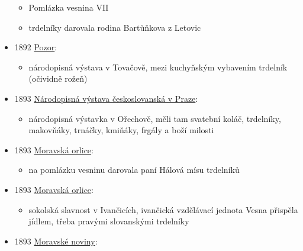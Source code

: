 \begin{itemize}
  \begin{itemize}
  \tightlist
  \item
    Pomlázka vesnina VII
  \item
    trdelníky darovala rodina Bartůňkova z Letovic
  \end{itemize}
\item
  1892
  \href{https://www.digitalniknihovna.cz/vkol/uuid/uuid:db92b18a-5f60-46e9-a666-022fa9c0f4f6}{Pozor}:

  \begin{itemize}
  \tightlist
  \item
    národopisná výstava v Tovačově, mezi kuchyňským vybavením trdelník
    (očividně rožeň)
  \end{itemize}
\item
  1893
  \href{https://ceskadigitalniknihovna.cz/uuid/uuid:765160d0-b6d7-11ea-b68c-005056827e52}{Národopisná
  výstava českoslovanská v Praze}:

  \begin{itemize}
  \tightlist
  \item
    národopisná výstavka v Ořechově, měli tam svatební koláč, trdelníky,
    makovňáky, trnáčky, kmiňáky, frgály a boží milosti
  \end{itemize}
\item
  1893
  \href{https://ceskadigitalniknihovna.cz/view/uuid:04fd1c48-32f0-11de-992b-00145e5790ea?page=uuid:298ab776-32f0-11de-992b-00145e5790ea&fulltext=vaje\%C4\%8D*\%20trdel*&source=mzk}{Moravská
  orlice}:

  \begin{itemize}
  \tightlist
  \item
    na pomlázku vesninu darovala paní Hálová mísu trdelníků
  \end{itemize}
\item
  1893
  \href{https://ceskadigitalniknihovna.cz/view/uuid:04ff8d70-32f0-11de-992b-00145e5790ea?page=uuid:299cdfa7-32f0-11de-992b-00145e5790ea&fulltext=trdeln\%C3\%AD*&source=mzk}{Moravská
  orlice}:

  \begin{itemize}
  \tightlist
  \item
    sokolská slavnost v Ivančicích, ivančická vzdělávací jednota Vesna
    přispěla jídlem, třeba pravými slovanskými trdelníky
  \end{itemize}
\item
  1893
  \href{https://www.digitalniknihovna.cz/vkol/uuid/uuid:7584cb6d-4978-4820-9af6-7d206917db08}{Moravské
  noviny}:


\end{itemize}
